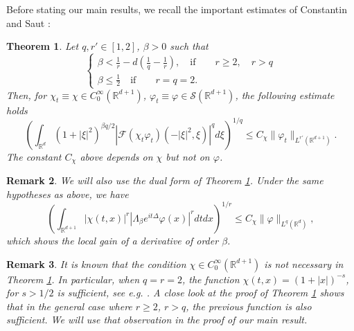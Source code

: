 \documentclass[12pt]{article}
\newtheorem{theorem}{Theorem}[section]
\newtheorem{remark}[theorem]{Remark}
\def \Rm {\mathbb R}
\def \Nm {\mathbb N}
\newcommand{\ds}{\displaystyle}
\newcommand{\calF}{\mathcal F}
\newcommand{\Tr}{\textrm{Tr}}
\newcommand{\calS}{\mathcal S}
\DeclarePairedDelimiter\bra{\langle}{\rvert}
\DeclarePairedDelimiter\ket{\lvert}{\rangle}
\begin{document}
Before stating our main results, we recall the important estimates of Constantin and Saut \cite{ConstSaut}: 
\begin{theorem} \label{thCS} Let $q,r' \in [1,2]$, $\beta>0$ such that
$$
\left\{
\begin{array}{l} \ds
\beta<\frac{1}{r}-d\left(\frac{1}{q}-\frac{1}{r}\right), \quad \textrm{if}\qquad r\geq 2, \quad r>q\\
\beta \leq \frac{1}{2}\quad \textrm{if}\qquad r=q=2.
\end{array}
\right.
$$ 
Then, for $\chi_t \equiv \chi \in C_0^\infty(\Rm^{d+1})$, $\varphi_t \equiv \varphi \in \calS(\Rm^{d+1})$, the following estimate holds
$$
\left(\int_{\Rm^d} (1+|\xi|^2)^{\beta q /2} |\calF(\chi_t \varphi_t)(-|\xi|^2,\xi)|^q d\xi \right)^{1/q} \leq C_\chi \| \varphi_t\|_{L^{r'}(\Rm^{d+1})}.
$$ 
The constant $C_\chi$ above depends on $\chi$ but not on $\varphi$.
\end{theorem}
\begin{remark} \label{remdual} We will also use the dual form of Theorem \ref{thCS}. Under the same hypotheses as above, we have
$$
\left(\int_{\Rm^{d+1}} |\chi(t,x)|^r |\Lambda_\beta e^{it \Delta}\varphi(x) |^r dtdx \right)^{1/r} \leq C_\chi \|\varphi\|_{L^{q}(\Rm^{d})},
$$ 
which shows the local gain of a derivative of order $\beta$. 
\end{remark}
\begin{remark}\label{remchi}
It is known that the condition $\chi \in C^\infty_0(\Rm^{d+1})$ is not necessary in Theorem \ref{thCS}. In particular, when $q=r=2$, the function $\chi(t,x)=(1+|x|)^{-s}$, for $s>1/2$ is sufficient, see e.g. \cite{vega}. A close look at the proof of Theorem \ref{thCS} shows that in the general case where $r\geq 2$, $r>q$, the previous function is also sufficient. We will use that observation in the proof of our main result.
\end{remark}
\end{document}
